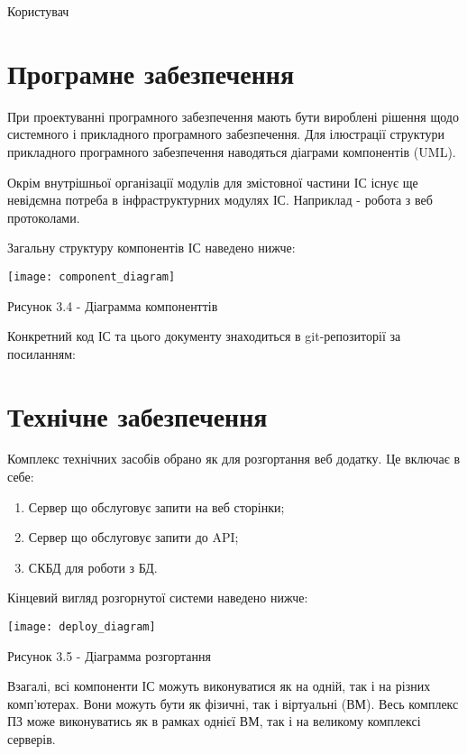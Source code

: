 Користувач 

\section{Програмне забезпечення}

При проектуванні програмного забезпечення мають бути вироблені рішення щодо системного і прикладного програмного забезпечення.
Для ілюстрації структури прикладного програмного забезпечення наводяться діаграми компонентів (UML).

Окрім внутрішньої організації модулів для змістовної частини ІС існує ще невідємна потреба в інфраструктурних модулях ІС. Наприклад -  робота з веб протоколами.

Загальну структуру компонентів ІС наведено нижче:

\begin{center}

\texttt{[image: component\_diagram]}

Рисунок 3.4 - Діаграмма компоненттів
\end{center}

Конкретний код ІС та цього документу знаходиться в git-репозиторії за посиланням: \cite{repo}

\section{Технічне забезпечення}

Комплекс технічних засобів обрано як для розгортання веб додатку. Це включає в себе:

\begin{enumerate}

\item Сервер що обслуговує запити на веб сторінки;

\item Сервер що обслуговує запити до API;

\item СКБД для роботи з БД.

\end{enumerate}

Кінцевий вигляд розгорнутої системи наведено нижче:

\begin{center}

\texttt{[image: deploy\_diagram]}

Рисунок 3.5 - Діаграмма розгортання

\end{center}

Взагалі, всі компоненти ІС можуть виконуватися як на одній, так і на різних комп'ютерах.  Вони можуть бути як фізичні, так і віртуальні (ВМ). Весь комплекс ПЗ може виконуватись як в рамках однієї ВМ, так і на великому комплексі серверів.

